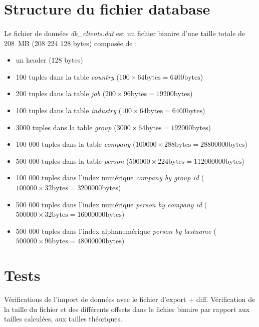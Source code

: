 \documentclass{article}
\begin{document}
    \section{Structure du fichier database}
    \paragraph{}
    Le fichier de données \emph{db\_clients.dat} est un fichier binaire d'une taille totale de 208 MB (208 224 128  bytes) composée de :
    \begin{itemize}[label=$\bullet$]
        \item un header (128 bytes)
        \item 100 tuples dans la table \emph{country} ($100 \times 64 \text{bytes} = 6400 \text{bytes}$)
        \item 200 tuples dans la table \emph{job} ($200 \times 96 \text{bytes} = 19200 \text{bytes}$)
        \item 100 tuples dans la table \emph{industry} ($100 \times 64 \text{bytes} = 6400 \text{bytes}$)
        \item 3000 tuples dans la table \emph{group} ($3000 \times 64 \text{bytes} = 192000 \text{bytes}$)
        \item 100 000 tuples dans la table \emph{company} ($100000 \times 288 \text{bytes} = 28800000 \text{bytes}$)
        \item 500 000 tuples dans la table \emph{person} ($500000 \times 224 \text{bytes} = 112000000 \text{bytes}$)
        \item 100 000 tuples dans l'index numérique \emph{company by group id} ($100000 \times 32 \text{bytes} = 3200000 \text{bytes}$)
        \item 500 000 tuples dans l'index numérique \emph{person by company id} ($500000 \times 32 \text{bytes} = 16000000 \text{bytes}$)
        \item 500 000 tuples dans l'index alphanumérique \emph{person by lastname} ($500000 \times 96 \text{bytes} = 48000000 \text{bytes}$)
    \end{itemize}



    \newpage
    \section{Tests}
    Vérifications de l'import de données avec le fichier d'export + diff.
    Vérification de la taille du fichier et des différents offsets dans le fichier binaire par rapport aux tailles calculées, aux tailles théoriques.
\end{document}
